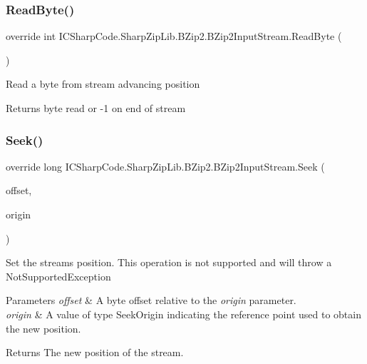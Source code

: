 \subsubsection{\texorpdfstring{Read\+Byte()}{ReadByte()}}
{\footnotesize\ttfamily override int I\+C\+Sharp\+Code.\+Sharp\+Zip\+Lib.\+B\+Zip2.\+B\+Zip2\+Input\+Stream.\+Read\+Byte (\begin{DoxyParamCaption}{ }\end{DoxyParamCaption})\hspace{0.3cm}{\ttfamily [inline]}}



Read a byte from stream advancing position 

\begin{DoxyReturn}{Returns}
byte read or -\/1 on end of stream
\end{DoxyReturn}
\mbox{\label{class_i_c_sharp_code_1_1_sharp_zip_lib_1_1_b_zip2_1_1_b_zip2_input_stream_a03df82487fd31e6f987adca7367ecb1b}} 
\subsubsection{\texorpdfstring{Seek()}{Seek()}}
{\footnotesize\ttfamily override long I\+C\+Sharp\+Code.\+Sharp\+Zip\+Lib.\+B\+Zip2.\+B\+Zip2\+Input\+Stream.\+Seek (\begin{DoxyParamCaption}\item[{long}]{offset,  }\item[{Seek\+Origin}]{origin }\end{DoxyParamCaption})\hspace{0.3cm}{\ttfamily [inline]}}



Set the streams position. This operation is not supported and will throw a Not\+Supported\+Exception 


\begin{DoxyParams}{Parameters}
{\em offset} & A byte offset relative to the {\itshape origin}  parameter.\\
\hline
{\em origin} & A value of type Seek\+Origin indicating the reference point used to obtain the new position.\\
\hline
\end{DoxyParams}
\begin{DoxyReturn}{Returns}
The new position of the stream.
\end{DoxyReturn}

